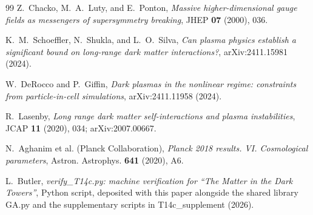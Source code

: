 \documentclass[11pt]{article}
\theoremstyle{definition}
\begin{document}
\begin{thebibliography}{99}
Z.~Chacko, M.~A.~Luty, and E.~Ponton,
\emph{Massive higher-dimensional gauge fields as messengers of supersymmetry breaking},
JHEP \textbf{07} (2000), 036.

K.~M.~Schoeffler, N.~Shukla, and L.~O.~Silva,
\emph{Can plasma physics establish a significant bound on long-range dark matter interactions?},
arXiv:2411.15981 (2024).

W.~DeRocco and P.~Giffin,
\emph{Dark plasmas in the nonlinear regime: constraints from particle-in-cell simulations},
arXiv:2411.11958 (2024).

R.~Lasenby,
\emph{Long range dark matter self-interactions and plasma instabilities},
JCAP \textbf{11} (2020), 034; arXiv:2007.00667.

N.~Aghanim et al. (Planck Collaboration),
\emph{Planck 2018 results. VI. Cosmological parameters},
Astron. Astrophys. \textbf{641} (2020), A6.

L.~Butler,
\emph{verify\_T14c.py: machine verification for ``The Matter in the Dark Towers''},
Python script, deposited with this paper alongside the shared library GA.py and the supplementary scripts in T14c\_supplement (2026).

\end{thebibliography}
\end{document}
